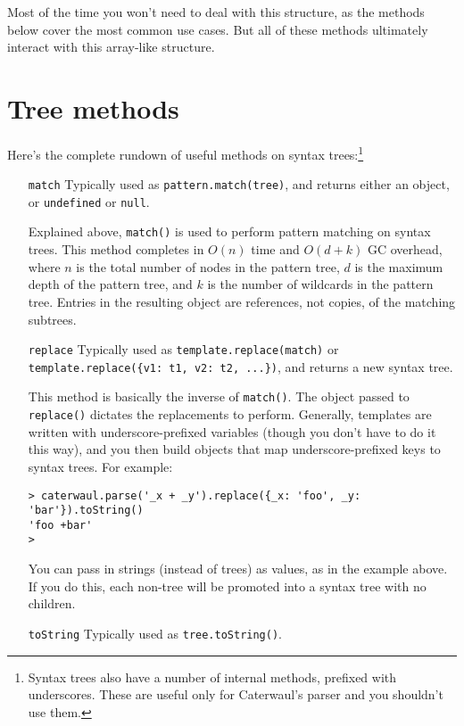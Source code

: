 \documentclass{report}
\begin{document}
    Most of the time you won't need to deal with this structure, as the methods below cover the most common use cases. But all of these methods ultimately interact with this array-like
    structure.

\section{Tree methods}
    Here's the complete rundown of useful methods on syntax trees:\footnote{Syntax trees also have a number of internal methods, prefixed with underscores. These are useful only for
    Caterwaul's parser and you shouldn't use them.}

\begin{enumerate}
\item[{\tt match}]
  Typically used as {\tt pattern.match(tree)}, and returns either an object, or {\tt undefined} or {\tt null}.

  Explained above, {\tt match()} is used to perform pattern matching on syntax trees. This method completes in $O(n)$ time and $O(d + k)$ GC overhead, where $n$ is the total number of
  nodes in the pattern tree, $d$ is the maximum depth of the pattern tree, and $k$ is the number of wildcards in the pattern tree. Entries in the resulting object are references, not
  copies, of the matching subtrees.

\item[{\tt replace}]
  Typically used as {\tt template.replace(match)} or \verb|template.replace({v1: t1, v2: t2, ...})|, and returns a new syntax tree.

  This method is basically the inverse of {\tt match()}. The object passed to {\tt replace()} dictates the replacements to perform. Generally, templates are written with
  underscore-prefixed variables (though you don't have to do it this way), and you then build objects that map underscore-prefixed keys to syntax trees. For example:

\begin{verbatim}
> caterwaul.parse('_x + _y').replace({_x: 'foo', _y: 'bar'}).toString()
'foo +bar'
>
\end{verbatim}

  You can pass in strings (instead of trees) as values, as in the example above. If you do this, each non-tree will be promoted into a syntax tree with no children.

\item[{\tt toString}]
  Typically used as {\tt tree.toString()}.


\end{enumerate}
\end{document}
